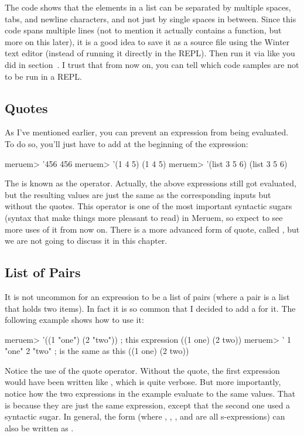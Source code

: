 The code shows that the elements in a list can be separated by multiple spaces, tabs, and newline characters, and not just by single spaces in between. Since this code spans multiple lines (not to mention it actually contains a  function, but more on this later), it is a good idea to save it as a source file using the Winter text editor (instead of running it directly in the REPL). Then run it via  like you did in section~. I trust that from now on, you can tell which code samples are not to be run in a REPL. 

\subsection{Quotes}
As I've mentioned earlier, you can prevent an expression from being evaluated. To do so, you'll just have to add  at the beginning of the expression:

\begin{REPL}
meruem> '456
456
meruem> '(1 4 5)
(1 4 5)
meruem> '(list 3 5 6)
(list 3 5 6)
\end{REPL}

The  is known as the  operator. Actually, the above expressions still got evaluated, but the resulting values are just the same as the corresponding inputs but without the quotes. This operator is one of the most important syntactic sugars (syntax that make things more pleasant to read) in Meruem, so expect to see more uses of it from now on. There is a more advanced form of quote, called , but we are not going to discuss it in this chapter.

\subsection{List of Pairs}
It is not uncommon for an expression to be a list of pairs (where a pair is a list that holds two items). In fact it is so common that I decided to add a  for it. The following example shows how to use it:

\begin{REPL}
meruem> '((1 "one") (2 "two"))  ; this expression
((1 one) (2 two))
meruem> '{ 1 "one" 2 "two" }  ; is the same as this
((1 one) (2 two))
\end{REPL}

Notice the use of the quote operator. Without the quote, the first expression would have been written like , which is quite verbose. But more importantly, notice how the two expressions in the example evaluate to the same values. That is because they are just the same expression, except that the second one used a syntactic sugar. In general, the form  (where , , , and  are all s-expressions) can also be written as .